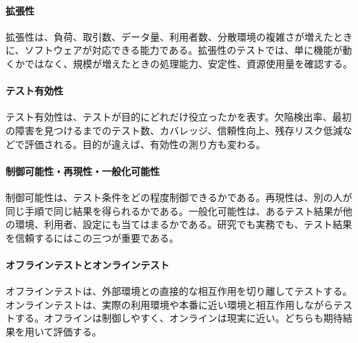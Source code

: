 \paragraph{拡張性}
拡張性は、負荷、取引数、データ量、利用者数、分散環境の複雑さが増えたときに、ソフトウェアが対応できる能力である。拡張性のテストでは、単に機能が動くかではなく、規模が増えたときの処理能力、安定性、資源使用量を確認する。

\paragraph{テスト有効性}
テスト有効性は、テストが目的にどれだけ役立ったかを表す。欠陥検出率、最初の障害を見つけるまでのテスト数、カバレッジ、信頼性向上、残存リスク低減などで評価される。目的が違えば、有効性の測り方も変わる。

\paragraph{制御可能性・再現性・一般化可能性}
制御可能性は、テスト条件をどの程度制御できるかである。再現性は、別の人が同じ手順で同じ結果を得られるかである。一般化可能性は、あるテスト結果が他の環境、利用者、設定にも当てはまるかである。研究でも実務でも、テスト結果を信頼するにはこの三つが重要である。

\paragraph{オフラインテストとオンラインテスト}
オフラインテストは、外部環境との直接的な相互作用を切り離してテストする。オンラインテストは、実際の利用環境や本番に近い環境と相互作用しながらテストする。オフラインは制御しやすく、オンラインは現実に近い。どちらも期待結果を用いて評価する。
